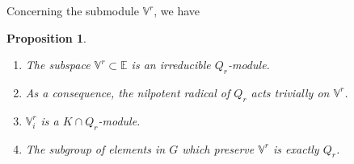 \documentclass[10pt]{amsart}
\theoremstyle{plain}
\newtheorem{prop}[theo]{Proposition}
\theoremstyle{definition}
\let\rgy r
\newcommand{\bE}{\mathbb{E}}
\newcommand{\Vr}{\mathbb{V}^\rgy}
\providecommand{\skpt}{\par\smallskip\noindent}
\begin{document}
Concerning the submodule $\Vr$, we have

\skpt
\begin{prop}
\label{prop:stabV}
\begin{enumerate}
\item \label{item:parabolic}
The subspace $\Vr \subset \bE$ is an irreducible $Q_\rgy$-module.
\item \label{item:reductive-Q}
As a consequence, the nilpotent radical of $Q_\rgy$ acts trivially on $\Vr$.
\item $\Vr_i$ is a $K\cap Q_\rgy$-module.
\item \label{item:stabilizer-V}
The subgroup of elements in $G$ which preserve $\Vr$ is exactly $Q_\rgy$.
\end{enumerate}
\end{prop}
\end{document}
